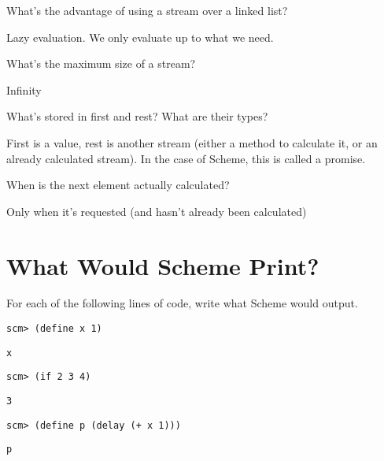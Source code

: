 \documentclass{exam}
\begin{document}
\begin{questions}
\begin{blocksection}
\question What's the advantage of using a stream over a linked list?
\begin{solution}[0.5in] 
Lazy evaluation. We only evaluate up to what we need.
\end{solution}

\question What's the maximum size of a stream?
\begin{solution}[0.5in]
Infinity
\end{solution}

\question What's stored in first and rest? What are their types? 
\begin{solution}[0.5in]
First is a value, rest is another stream (either a method to calculate it, or an already calculated stream). In the case of Scheme, this is called a promise.
\end{solution}

\question When is the next element actually calculated?
\begin{solution}[.5in]
Only when it's requested (and hasn't already been calculated)
\end{solution}
\end{blocksection}


\section{What Would Scheme Print?}
\begin{blocksection}
\question For each of the following lines of code, write what Scheme would output.

\begin{lstlisting}
scm> (define x 1)
\end{lstlisting}
\begin{solution}[.45in]
\texttt{x}
\end{solution}

\begin{lstlisting}
scm> (if 2 3 4)
\end{lstlisting}
\begin{solution}[.45in]
\texttt{3}
\end{solution}

\begin{lstlisting}
scm> (define p (delay (+ x 1)))
\end{lstlisting}
\begin{solution}[.45in]
\begin{lstlisting}
p
\end{lstlisting}
\end{solution}


\end{blocksection}
\end{questions}
\end{document}
